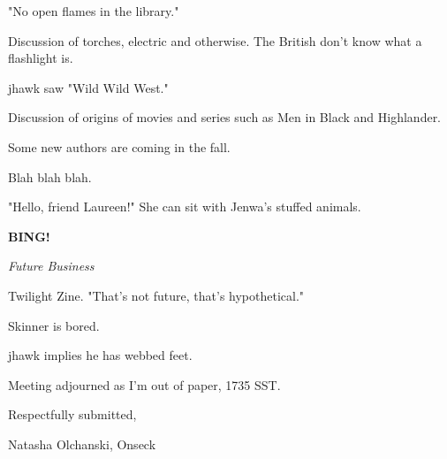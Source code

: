 \documentclass[12pt]{article}
\newcommand{\bing}{{\bf BING!} }
\newcommand{\goto}[1]{\bing \vskip 12pt \centerline{{\em{#1}}}}
\begin{document}
"No open flames in the library."

Discussion of torches, electric and otherwise. The British don't know what a flashlight is.

jhawk saw "Wild Wild West."

Discussion of origins of movies and series such as Men in Black and Highlander.

Some new authors are coming in the fall.

Blah blah blah.

"Hello, friend Laureen!" She can sit with Jenwa's stuffed animals.

\goto{Future Business}

Twilight Zine. "That's not future, that's hypothetical."

Skinner is bored.

jhawk implies he has webbed feet.

\vspace{12pt}

\noindent
Meeting adjourned as I'm out of paper, 1735 SST.

\vspace{18pt}

\centerline{Respectfully submitted,}
\centerline{Natasha Olchanski, Onseck}
\end{document}

